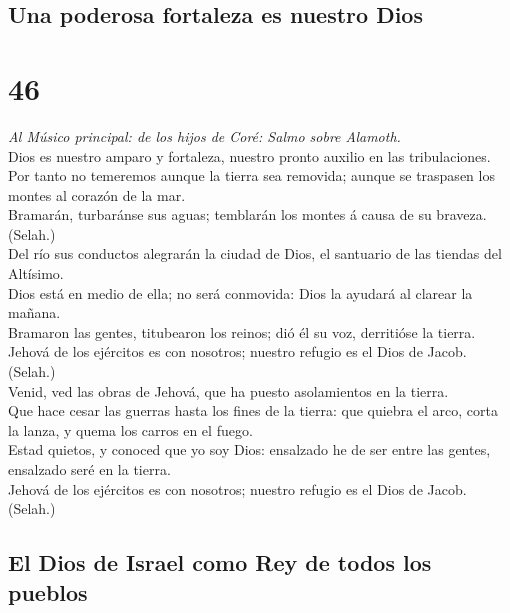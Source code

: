 \hypertarget{una-poderosa-fortaleza-es-nuestro-dios}{%
\subsection{Una poderosa fortaleza es nuestro
Dios}\label{una-poderosa-fortaleza-es-nuestro-dios}}

\hypertarget{section-45}{%
\section{46}\label{section-45}}

 \emph{Al Músico principal: de los hijos de Coré: Salmo
sobre Alamoth.}\\
Dios es nuestro amparo y fortaleza, nuestro pronto auxilio en las
tribulaciones.\\
 Por tanto no temeremos aunque la tierra sea removida;
aunque se traspasen los montes al corazón de la mar.\\
 Bramarán, turbaránse sus aguas; temblarán los montes á
causa de su braveza. (Selah.)\\
 Del río sus conductos alegrarán la ciudad de Dios, el
santuario de las tiendas del Altísimo.\\
 Dios está en medio de ella; no será conmovida: Dios la
ayudará al clarear la mañana.\\
 Bramaron las gentes, titubearon los reinos; dió él su voz,
derritióse la tierra.\\
 Jehová de los ejércitos es con nosotros; nuestro refugio es
el Dios de Jacob. (Selah.)\\
 Venid, ved las obras de Jehová, que ha puesto asolamientos
en la tierra.\\
 Que hace cesar las guerras hasta los fines de la tierra:
que quiebra el arco, corta la lanza, y quema los carros en el fuego.\\
 Estad quietos, y conoced que yo soy Dios: ensalzado he de
ser entre las gentes, ensalzado seré en la tierra.\\
 Jehová de los ejércitos es con nosotros; nuestro refugio
es el Dios de Jacob. (Selah.)

\hypertarget{el-dios-de-israel-como-rey-de-todos-los-pueblos}{%
\subsection{El Dios de Israel como Rey de todos los
pueblos}\label{el-dios-de-israel-como-rey-de-todos-los-pueblos}}

